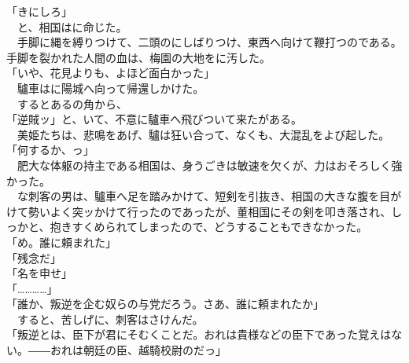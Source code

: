 \documentclass[
  paper=a5,
  fontsize=10pt,
  jafontsize=9.5pt,
  tate,                  %
  open_bracket_pos=nibu, %
]{jlreq}
\begin{document}
「きにしろ」\\


　と、相国はに命じた。\\


　手脚に縄を縛りつけて、二頭のにしばりつけ、東西へ向けて鞭打つのである。手脚を裂かれた人間の血は、梅園の大地をに汚した。\\


「いや、花見よりも、よほど面白かった」\\


　驢車はに陽城へ向って帰還しかけた。\\


　するとあるの角から、\\


「逆賊ッ」と、いて、不意に驢車へ飛びついて来たがある。\\


　美姫たちは、悲鳴をあげ、驢は狂い合って、なくも、大混乱をよび起した。\\


「何するか、っ」\\


　肥大な体躯の持主である相国は、身うごきは敏速を欠くが、力はおそろしく強かった。\\


　な刺客の男は、驢車へ足を踏みかけて、短剣を引抜き、相国の大きな腹を目がけて勢いよく突ッかけて行ったのであったが、董相国にその剣を叩き落され、しっかと、抱きすくめられてしまったので、どうすることもできなかった。\\


「め。誰に頼まれた」\\


「残念だ」\\


「名を申せ」\\


「…………」\\


「誰か、叛逆を企む奴らの与党だろう。さあ、誰に頼まれたか」\\


　すると、苦しげに、刺客はさけんだ。\\


「叛逆とは、臣下が君にそむくことだ。おれは貴様などの臣下であった覚えはない。――おれは朝廷の臣、越騎校尉のだっ」\\
\end{document}
